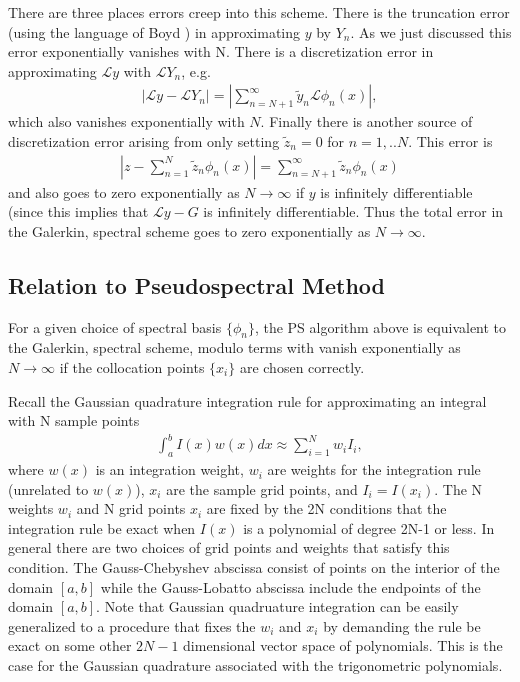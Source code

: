 \documentclass[aps,prd,amsmath,showpacs,amssymb,superscriptaddress,nofootinbib,longbibliography,eqsecnum,preprintnumbers]{revtex4-1}
\begin{document}
There are three places errors creep into this scheme. 
There is the truncation error (using the language of Boyd \cite{Boyd99chebyshevand}) in approximating $y$ by $Y_n$. As we just discussed this error exponentially vanishes with N.
There is a discretization error in approximating $\mathcal L y$ with $\mathcal L Y_n$, e.g.
\begin{align}
|\mathcal L y -\mathcal L Y_n|=\left|\sum_{n=N+1}^\infty \tilde y_n\mathcal L \phi_n(x)\right|,
\end{align}
which also vanishes exponentially with $N$. 
Finally there is another source of discretization error arising from only setting $\tilde z_n =0$ for $n=1,..N$. This error is
\begin{align}
\left|z-\sum_{n=1}^N\tilde z_n \phi_n(x)\right|=\sum_{n=N+1}^\infty \tilde z_n \phi_n(x)
\end{align}
and also goes to zero exponentially as $N\to \infty$ if $y$ is infinitely differentiable (since this implies that $\mathcal{L} y-G$ is infinitely differentiable.
Thus the total error in the Galerkin, spectral scheme goes to zero exponentially as $N\to \infty$.

\subsection{Relation to Pseudospectral Method}

For a given choice of spectral basis $\{\phi_n\}$, the PS algorithm above is equivalent to the Galerkin, spectral scheme, modulo terms with vanish exponentially as $N\to \infty$ if the collocation points $\{x_i\}$ are chosen correctly.

Recall the Gaussian quadrature integration rule for approximating an integral with N sample points
\begin{align}
\int_a^bI(x)w(x)dx\approx \sum_{i=1}^N w_i I_i,
\end{align}
where $w(x)$ is an integration weight, $w_i$ are weights for the integration rule (unrelated to $w(x)$), $x_i$ are the sample grid points, and $I_i=I(x_i)$. The N weights $w_i$ and N grid points $x_i$ are fixed by the 2N conditions that the integration rule be exact when $I(x)$ is a polynomial of degree 2N-1 or less. In general there are two choices of grid points and weights that satisfy this condition. The Gauss-Chebyshev abscissa consist of points on the interior of the domain $[a,b]$ while the Gauss-Lobatto abscissa include the endpoints of the domain $[a,b]$. Note that Gaussian quadruature integration can be easily generalized to a procedure that fixes the $w_i$ and $x_i$ by demanding the rule be exact on some other $2N-1$ dimensional vector space of polynomials. This is the case for the Gaussian quadrature associated with the trigonometric polynomials.
\end{document}
